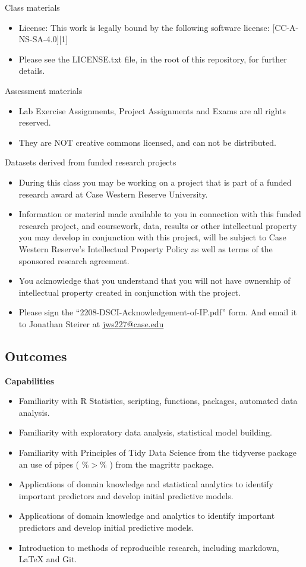 \documentclass[10pt]{article} %
\begin{document}
    Class materials
    \begin{itemize}
      \item License: This work is legally bound by the following software license: [CC-A-NS-SA-4.0][1]
      \item Please see the LICENSE.txt file, in the root of this repository, for further details.
    \end{itemize}

    Assessment materials
    \begin{itemize}
      \item Lab Exercise Assignments, Project Assignments and Exams are all rights reserved.
      \item They are NOT creative commons licensed, and can not be distributed.
    \end{itemize}

    Datasets derived from funded research projects
    \begin{itemize}
      \item During this class you may be working on a project that is part of a funded research award at Case Western Reserve University.
      \item Information or material made available to you in connection with this funded research project, and coursework, data, results or other intellectual property you may develop in conjunction with this project, will be subject to Case Western Reserve’s Intellectual Property Policy as well as terms of the sponsored research agreement.
      \item You acknowledge that you understand that you will not have ownership of intellectual property created in conjunction with the project.
      \item Please sign the ``2208-DSCI-Acknowledgement-of-IP.pdf'' form. And email it to Jonathan Steirer at \href{mailto:jws227@case.edu}{jws227@case.edu}
    \end{itemize}

  \subsection{Outcomes}

    {\bf Capabilities}
    \begin{itemize}
    	\item Familiarity with R Statistics, scripting, functions, packages, automated data analysis.
    	\item Familiarity with exploratory data analysis, statistical model building.
        \item Familiarity with Principles of Tidy Data Science from the tidyverse package an use of pipes ( $\%>\%$ ) from the magrittr package.
    	\item Applications of domain knowledge and statistical analytics to identify important predictors and develop initial predictive models.
    	\item Applications of domain knowledge and analytics to identify important predictors and develop initial predictive models.
    	\item Introduction to methods of reproducible research, including markdown, LaTeX and Git.
    \end{itemize}
\end{document}

